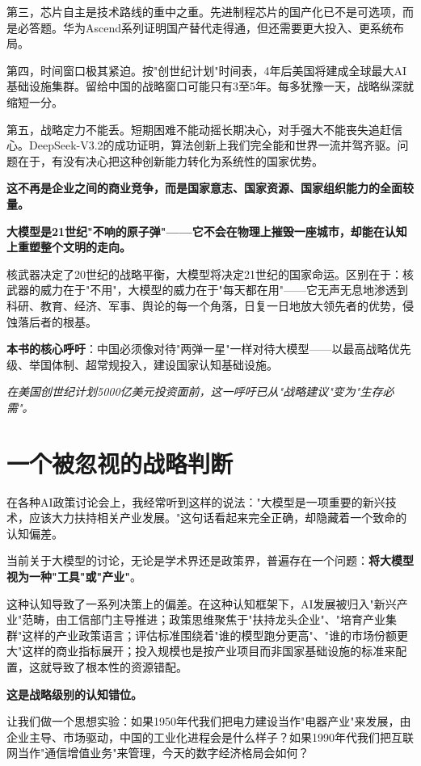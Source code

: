 第三，芯片自主是技术路线的重中之重。先进制程芯片的国产化已不是可选项，而是必答题。华为Ascend系列证明国产替代走得通，但还需要更大投入、更系统布局。

第四，时间窗口极其紧迫。按"创世纪计划"时间表，4年后美国将建成全球最大AI基础设施集群。留给中国的战略窗口可能只有3至5年。每多犹豫一天，战略纵深就缩短一分。

第五，战略定力不能丢。短期困难不能动摇长期决心，对手强大不能丧失追赶信心。DeepSeek-V3.2的成功证明，算法创新上我们完全能和世界一流并驾齐驱。问题在于，有没有决心把这种创新能力转化为系统性的国家优势。

\textbf{这不再是企业之间的商业竞争，而是国家意志、国家资源、国家组织能力的全面较量。}


\textbf{大模型是21世纪"不响的原子弹"——它不会在物理上摧毁一座城市，却能在认知上重塑整个文明的走向。}

核武器决定了20世纪的战略平衡，大模型将决定21世纪的国家命运。区别在于：核武器的威力在于"不用"，大模型的威力在于"每天都在用"——它无声无息地渗透到科研、教育、经济、军事、舆论的每一个角落，日复一日地放大领先者的优势，侵蚀落后者的根基。

\textbf{本书的核心呼吁}：中国必须像对待"两弹一星"一样对待大模型——以最高战略优先级、举国体制、超常规投入，建设国家认知基础设施。

\textit{在美国创世纪计划5000亿美元投资面前，这一呼吁已从"战略建议"变为"生存必需"。}

\section{一个被忽视的战略判断}

在各种AI政策讨论会上，我经常听到这样的说法："大模型是一项重要的新兴技术，应该大力扶持相关产业发展。"这句话看起来完全正确，却隐藏着一个致命的认知偏差。

当前关于大模型的讨论，无论是学术界还是政策界，普遍存在一个问题：\textbf{将大模型视为一种"工具"或"产业"}。

这种认知导致了一系列决策上的偏差。在这种认知框架下，AI发展被归入"新兴产业"范畴，由工信部门主导推进；政策思维聚焦于"扶持龙头企业"、"培育产业集群"这样的产业政策语言；评估标准围绕着"谁的模型跑分更高"、"谁的市场份额更大"这样的商业指标展开；投入规模也是按产业项目而非国家基础设施的标准来配置，这就导致了根本性的资源错配。

\textbf{这是战略级别的认知错位。}

让我们做一个思想实验：如果1950年代我们把电力建设当作"电器产业"来发展，由企业主导、市场驱动，中国的工业化进程会是什么样子？如果1990年代我们把互联网当作"通信增值业务"来管理，今天的数字经济格局会如何？

